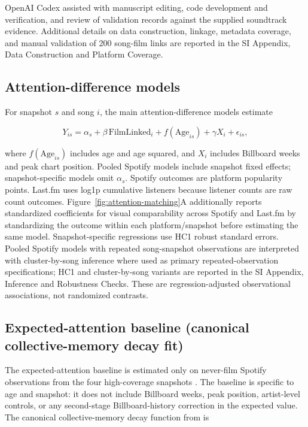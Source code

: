 \documentclass[10pt]{article}
\begin{document}
OpenAI Codex assisted with manuscript editing, code development and verification, and review of validation records against the supplied soundtrack evidence. Additional details on data construction, linkage, metadata coverage, and manual validation of 200 song-film links are reported in the SI Appendix, Data Construction and Platform Coverage.

\subsection*{Attention-difference models}

For snapshot $s$ and song $i$, the main attention-difference models estimate

\begin{equation}
Y_{is}=\alpha_s+\beta\,\mathrm{FilmLinked}_i+f(\mathrm{Age}_{is})+\gamma X_i+\epsilon_{is},
\end{equation}

where $f(\mathrm{Age}_{is})$ includes age and age squared, and $X_i$ includes Billboard weeks and peak chart position. Pooled Spotify models include snapshot fixed effects; snapshot-specific models omit $\alpha_s$. Spotify outcomes are platform popularity points. Last.fm uses log1p cumulative listeners because listener counts are raw count outcomes. Figure~\ref{fig:attention-matching}A additionally reports standardized coefficients for visual comparability across Spotify and Last.fm by standardizing the outcome within each platform/snapshot before estimating the same model. Snapshot-specific regressions use HC1 robust standard errors. Pooled Spotify models with repeated song-snapshot observations are interpreted with cluster-by-song inference where used as primary repeated-observation specifications; HC1 and cluster-by-song variants are reported in the SI Appendix, Inference and Robustness Checks. These are regression-adjusted observational associations, not randomized contrasts.

\subsection*{Expected-attention baseline (canonical collective-memory decay fit)}

The expected-attention baseline is estimated only on never-film Spotify observations from the four high-coverage snapshots \citep{Candia2025DataScienceCollectiveMemory}. The baseline is specific to age and snapshot: it does not include Billboard weeks, peak position, artist-level controls, or any second-stage Billboard-history correction in the expected value. The canonical collective-memory decay function from \citet{Candia2019} is
\end{document}

